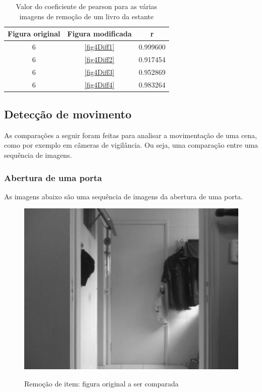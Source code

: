 \documentclass[10pt,a4paper]{article}
\begin{document}
\vspace{-1.0cm}
\begin{table}[h!]
  \begin{center}
    \caption{Valor do coeficiente de pearson para as várias imagens de
      remoção de um livro da estante}
    \begin{tabular}{|c|c|c|}
      \hline
      Figura original & Figura modificada & r\\
      \hline
      6 &  \ref{fig4Diff1} & 0.999600\\
      6 &  \ref{fig4Diff2} &  0.917454\\
      6 &  \ref{fig4Diff3} &   0.952869\\
      6 &  \ref{fig4Diff4} &   0.983264\\
      \hline
    \end{tabular}\label{tab:livro}
  \end{center}
\end{table}


\newpage
\subsection{Detecção de movimento}
As comparações a seguir foram feitas para analisar a movimentação de uma cena, como por exemplo em câmeras de
vigilância. Ou seja, uma comparação entre uma sequência de imagens.

\subsubsection{Abertura de uma porta}
As imagens abaixo são uma sequência de imagens da
abertura de uma porta.

\begin{figure}[h!]
\begin{center}
\includegraphics[scale=0.35]{photos/porta/gBase} \label{porta}
\caption{Remoção de item: figura original a ser comparada}
\end{center}
\end{figure}
\end{document}
